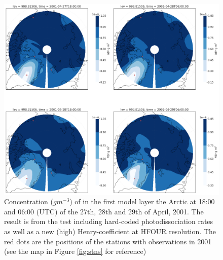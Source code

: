 \begin{figure}[h]
    \centering
    \includegraphics[width=\linewidth]{Chapter6_Results/images/polarHBr_HFOUR_step3.png}
    \caption{Concentration ($g m^{-3}$) of  in the first model layer the Arctic at 18:00 and 06:00 (UTC) of the 27th, 28th and 29th of April, 2001. The result is from the test including hard-coded photodissociation rates as well as a new (high) Henry-coefficient at HFOUR resolution. The red dots are the positions of the stations with observations in 2001 (see the map in Figure \ref{fig:stns} for reference)}
    \label{fig:polarHBr_HFOUR_step3}
\end{figure}